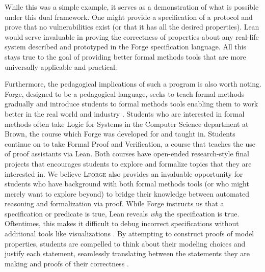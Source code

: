 While this was a simple example, it serves as a demonstration of what is possible under this dual framework. One might provide a specification of a protocol and prove that no vulnerabilities exist (or that it has all the desired properties). Lean would serve invaluable in proving the correctness of properties about any real-life system described and prototyped in the Forge specification language. All this stays true to the goal of providing better formal methods tools that are more universally applicable and practical. 

Furthermore, the pedagogical implications of such a program is also worth noting. Forge, designed to be a pedagogical language, seeks to teach formal methods gradually and introduce students to formal methods tools enabling them to work better in the real world and industry \cite{ngpdbccdlrrvwwk-oopsla-2024}. Students who are interested in formal methods often take Logic for Systems in the Computer Science department at Brown, the course which Forge was developed for and taught in. Students continue on to take Formal Proof and Verification, a course that teaches the use of proof assistants via Lean. Both courses have open-ended research-style final projects that encourages students to explore and formalize topics that they are interested in. We believe \textsc{Lforge} also provides an invaluable opportunity for students who have background with both formal methods tools (or who might merely want to explore beyond) to bridge their knowledge between automated reasoning and formalization via proof. While Forge instructs us that a specification or predicate is true, Lean reveals \emph{why} the specification is true. Oftentimes, this makes it difficult to debug incorrect specifications without additional tools like visualizations \cite{ngpdbccdlrrvwwk-oopsla-2024}. By attempting to construct proofs of model properties, students are compelled to think about their modeling choices and justify each statement, seamlessly translating between the statements they are making and proofs of their correctness \cite{avigad2019learning}. 